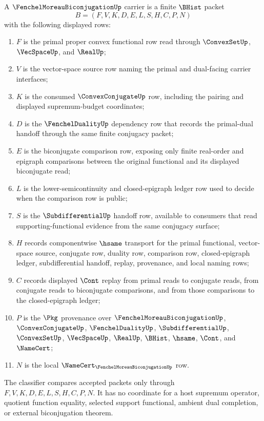 \begin{definition}
\label{def:fenchel-moreau-biconjugation-carrier}
A $\FenchelMoreauBiconjugationUp$ carrier is a finite $\BHist$ packet
$$
B=(F,V,K,D,E,L,S,H,C,P,N)
$$
with the following displayed rows:
\begin{enumerate}
\item $F$ is the primal proper convex functional row read through $\ConvexSetUp$, $\VecSpaceUp$, and $\RealUp$;
\item $V$ is the vector-space source row naming the primal and dual-facing carrier interfaces;
\item $K$ is the consumed $\ConvexConjugateUp$ row, including the pairing and displayed supremum-budget coordinates;
\item $D$ is the $\FenchelDualityUp$ dependency row that records the primal-dual handoff through the same finite conjugacy packet;
\item $E$ is the biconjugate comparison row, exposing only finite real-order and epigraph comparisons between the original functional and its displayed biconjugate read;
\item $L$ is the lower-semicontinuity and closed-epigraph ledger row used to decide when the comparison row is public;
\item $S$ is the $\SubdifferentialUp$ handoff row, available to consumers that read supporting-functional evidence from the same conjugacy surface;
\item $H$ records componentwise $\hsame$ transport for the primal functional, vector-space source, conjugate row, duality row, comparison row, closed-epigraph ledger, subdifferential handoff, replay, provenance, and local naming rows;
\item $C$ records displayed $\Cont$ replay from primal reads to conjugate reads, from conjugate reads to biconjugate comparisons, and from those comparisons to the closed-epigraph ledger;
\item $P$ is the $\Pkg$ provenance over $\FenchelMoreauBiconjugationUp$, $\ConvexConjugateUp$, $\FenchelDualityUp$, $\SubdifferentialUp$, $\ConvexSetUp$, $\VecSpaceUp$, $\RealUp$, $\BHist$, $\hsame$, $\Cont$, and $\NameCert$;
\item $N$ is the local $\NameCert_{\FenchelMoreauBiconjugationUp}$ row.
\end{enumerate}
The classifier compares accepted packets only through $F,V,K,D,E,L,S,H,C,P,N$. It has no coordinate for a host supremum operator, quotient function equality, selected support functional, ambient dual completion, or external biconjugation theorem.
\end{definition}

